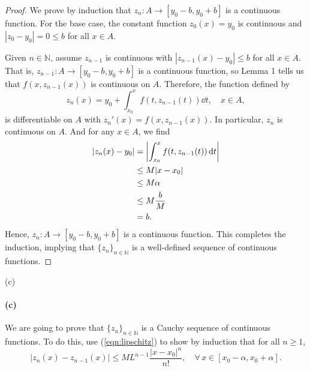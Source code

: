 \documentclass[12pt]{article}
\newenvironment{fullbox}{\begin{lrbox}{\savefullbox}\begin{minipage}{\dimexpr\textwidth-2\fboxsep\relax}}{\end{minipage}\end{lrbox}\begin{center}\framebox[\textwidth]{\usebox{\savefullbox}}\end{center}}
\newenvironment{pbox}[1][]{\begin{fullbox}\ifx#1\empty\else\paragraph{#1}\fi}{\end{fullbox}}
\theoremstyle{definition}
\newcommand{\N}{\mathbb{N}}
\newcommand{\seq}[2]{\{#1\}_{#2\in\N}}
\begin{document}
\begin{proof}
    We prove by induction that $z_n : A \to [y_0 - b, y_0 + b]$ is a continuous function. For the base case, the constant function $z_0(x) = y_0$ is continuous and $|z_0 - y_0| = 0 \leq b$ for all $x \in A$.
    
    Given $n \in \N$, assume $z_{n-1}$ is continuous with $|z_{n-1}(x) - y_0| \leq b$ for all $x \in A$. That is, $z_{n-1} : A \to [y_0 - b, y_0 + b]$ is a continuous function, so Lemma 1 tells us that $f(x, z_{n-1}(x))$ is continuous on $A$. Therefore, the function defined by
    \[
        z_n(x) = y_0 + \int_{x_0}^x f(t,z_{n-1}(t)) \dd{t}, \quad x \in A,
    \]
    is differentiable on $A$ with $z_n'(x) = f(x, z_{n-1}(x))$. In particular, $z_n$ is continuous on $A$. And for any $x \in A$, we find
    \begin{align*}
        |z_n(x) - y_0|
            &= \abs{\int_{x_0}^x f(t,z_{n-1}(t)) \dd{t}} \\
            &\leq M|x - x_0| \\
            & \leq M\alpha \\
            &\leq M\frac{b}{M} \\
            &= b.
    \end{align*}
    Hence, $z_n : A \to [y_0 - b, y_0 + b]$ is a continuous function. This completes the induction, implying that $\seq{z_n}{n}$ is a well-defined sequence of continuous functions.
    
    
\end{proof}



\newpage
\begin{pbox}[(c)]
    We are going to prove that $\{z_n\}_{n\in\N}$ is a Cauchy sequence of continuous functions. To do this, use (\ref{eqn:lipschitz}) to show by induction that for all $n\ge 1$, 
    \begin{equation}
    |z_n(x)-z_{n-1}(x)| \le ML^{n-1}\frac{|x-x_0|^n}{n!},\quad \forall\,x \in [x_0-\alpha,x_0+\alpha].
    \end{equation}
\end{pbox}
\end{document}

